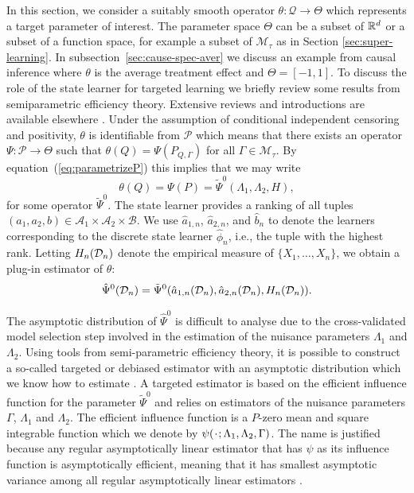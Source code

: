 In this section, we consider a suitably smooth operator
\( \theta \colon \mathcal{Q} \rightarrow \Theta \) which represents a
target parameter of interest. The parameter space $\Theta$ can be a
subset of \(\mathbb{R}^d\) or a subset of a function space, for example a
subset of \(\mathcal{M}_{\tau}\) as in Section
\ref{sec:super-learning}. In subsection~\ref{sec:cause-spec-aver} we
discuss an example from causal inference where $\theta$ is the average
treatment effect and \( \Theta = [-1,1] \).  To discuss the role of
the state learner for targeted learning we briefly review some results
from semiparametric efficiency theory. Extensive reviews and
introductions are available elsewhere
\cite[e.g.,][]{pfanzagl1985contributions,bickel1993efficient,van2003unified,tsiatis2007semiparametric,kennedy2016semiparametric}.
Under the assumption of conditional independent censoring and
positivity, $\theta$ is identifiable from \( \mathcal{P} \) which
means that there exists an operator
\( \Psi \colon \mathcal{P} \rightarrow \Theta \) such that
\( \theta(Q) = \Psi(P_{Q, \Gamma}) \) for all
$\Gamma \in \mathcal{M}_{\tau}$.  By equation~(\ref{eq:parametrizeP})
this implies that we may write
\begin{equation*}
  \theta(Q) = \Psi(P) = \tilde{\Psi}^0(\Lambda_1, \Lambda_2, H),
\end{equation*}
for some operator \( \tilde{\Psi}^0 \). The state learner provides a ranking of
all tuples
\( (a_1, a_2, b) \in \mathcal{A}_1 \times \mathcal{A}_2 \times \mathcal{B} \).
We use \( \hat{a}_{1,n} \), \( \hat{a}_{2,n} \), and \( \hat{b}_n \) to denote
the learners corresponding to the discrete state learner \( \hat{\phi}_n \),
i.e., the tuple with the highest rank. Letting \( H_n(\mathcal{D}_n) \) denote the
empirical measure of \( \{X_1, \dots, X_n\} \), we obtain a plug-in estimator of
$\theta$:
\begin{equation}
  \label{eq:2}
  \hat{\Psi}^0(\mathcal{D}_n) =
  \tilde{\Psi}^0(\hat{a}_{1,n}(\mathcal{D}_n), \hat{a}_{2,n}(\mathcal{D}_n), H_n(\mathcal{D}_n)). 
\end{equation}

The asymptotic distribution of \( \hat{\Psi}^0 \) is
difficult to analyse due to the cross-validated model selection step
involved in the estimation of the nuisance parameters $\Lambda_1$ and
$\Lambda_2$.
Using tools from semi-parametric efficiency theory, it is possible to
construct a so-called targeted or debiased estimator with an
asymptotic distribution which we know how to estimate
\citep{bickel1993efficient,van2011targeted,chernozhukov2018double}. A
targeted estimator is based on the efficient influence function for
the parameter $\tilde{\Psi}^0$ and relies on estimators of the
nuisance parameters $\Gamma$, \( \Lambda_1 \) and $\Lambda_2$. The
efficient influence function is a \( P \)-zero mean and square
integrable function which we denote by
\( \psi(\blank ; \Lambda_1, \Lambda_2, \Gamma) \). The name is
justified because any regular asymptotically linear estimator that has
\( \psi \) as its influence function is asymptotically efficient,
meaning that it has smallest asymptotic variance among all regular
asymptotically linear estimators \citep{bickel1993efficient}.

